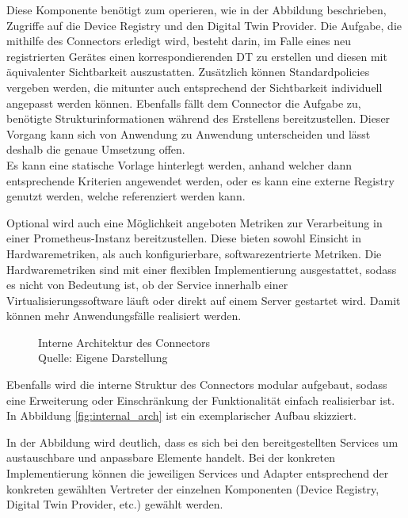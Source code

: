 Diese Komponente benötigt zum operieren, wie in der Abbildung beschrieben, Zugriffe auf die Device Registry und den Digital Twin Provider. Die Aufgabe, die mithilfe des Connectors erledigt wird, besteht darin, im Falle eines neu registrierten Gerätes einen korrespondierenden \ac{DT} zu erstellen und diesen mit äquivalenter Sichtbarkeit auszustatten. Zusätzlich können Standardpolicies vergeben werden, die mitunter auch entsprechend der Sichtbarkeit individuell angepasst werden können. Ebenfalls fällt dem Connector die Aufgabe zu, benötigte Strukturinformationen während des Erstellens bereitzustellen. Dieser Vorgang kann sich von Anwendung zu Anwendung unterscheiden und lässt deshalb die genaue Umsetzung offen.\\
Es kann eine statische Vorlage hinterlegt werden, anhand welcher dann entsprechende Kriterien angewendet werden, oder es kann eine externe Registry genutzt werden, welche referenziert werden kann.

Optional wird auch eine Möglichkeit angeboten Metriken zur Verarbeitung in einer Prometheus-Instanz bereitzustellen. Diese bieten sowohl Einsicht in Hardwaremetriken, als auch konfigurierbare, softwarezentrierte Metriken. Die Hardwaremetriken sind mit einer flexiblen Implementierung ausgestattet, sodass es nicht von Bedeutung ist, ob der Service innerhalb einer Virtualisierungssoftware läuft oder direkt auf einem Server gestartet wird. Damit können mehr Anwendungsfälle realisiert werden.

\begin{figure}[b]
    \centering
    \caption{Interne Architektur des Connectors\\Quelle: Eigene Darstellung}
    \label{fig:internal_arch}
\end{figure}
Ebenfalls wird die interne Struktur des Connectors modular aufgebaut, sodass eine Erweiterung oder Einschränkung der Funktionalität einfach realisierbar ist. In Abbildung \vref{fig:internal_arch} ist ein exemplarischer Aufbau skizziert.

In der Abbildung wird deutlich, dass es sich bei den bereitgestellten Services um austauschbare und anpassbare Elemente handelt. Bei der konkreten Implementierung können die jeweiligen Services und Adapter entsprechend der konkreten gewählten Vertreter der einzelnen Komponenten (Device Registry, Digital Twin Provider, etc.) gewählt werden.

